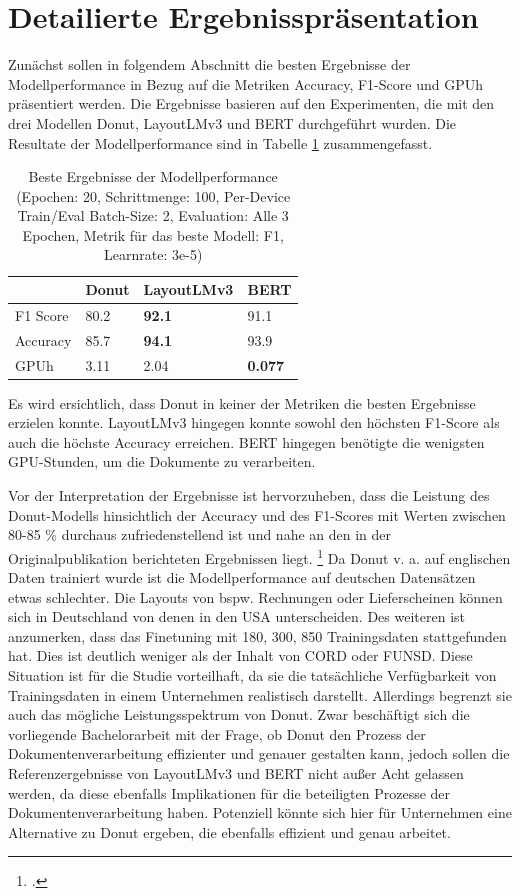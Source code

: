 \section{Detailierte Ergebnisspräsentation}
Zunächst sollen in folgendem Abschnitt die besten Ergebnisse der Modellperformance in Bezug auf die Metriken Accuracy, F1-Score und GPUh präsentiert werden. Die Ergebnisse basieren auf den Experimenten, die mit den drei Modellen Donut, LayoutLMv3 und BERT durchgeführt wurden. Die Resultate der Modellperformance sind in Tabelle \ref{tab:best_results} zusammengefasst.
\begin{table}[h]    
\centering
    \begin{tabularx}{\textwidth}{lXXX}
      \toprule
      & \textbf{Donut} & \textbf{LayoutLMv3} & \textbf{BERT}  \\
      \midrule
      F1 Score & 80.2 & \textbf{92.1} & 91.1 \\
      \addlinespace
      Accuracy & 85.7 & \textbf{94.1} & 93.9 \\
        \addlinespace
        GPUh & 3.11 & 2.04 & \textbf{0.077} \\
      \bottomrule
    \end{tabularx}
    \caption{Beste Ergebnisse der Modellperformance (Epochen: 20, Schrittmenge: 100, Per-Device Train/Eval Batch-Size: 2, Evaluation: Alle 3 Epochen, Metrik für das beste Modell: F1, Learnrate: 3e-5)}
    \label{tab:best_results}
\end{table}
Es wird ersichtlich, dass Donut in keiner der Metriken die besten Ergebnisse erzielen konnte. LayoutLMv3 hingegen konnte sowohl den höchsten F1-Score als auch die höchste Accuracy erreichen. BERT hingegen benötigte die wenigsten GPU-Stunden, um die Dokumente zu verarbeiten. 

Vor der Interpretation der Ergebnisse ist hervorzuheben, dass die Leistung des Donut-Modells hinsichtlich der Accuracy und des F1-Scores mit Werten zwischen 80-85 \% durchaus zufriedenstellend ist und nahe an den in der Originalpublikation berichteten Ergebnissen liegt. \footcites[Vgl.][]{kim_ocr-free_2021} Da Donut v. a. auf englischen Daten trainiert wurde ist die Modellperformance auf deutschen Datensätzen etwas schlechter. Die Layouts von bspw. Rechnungen oder Lieferscheinen können sich in Deutschland von denen in den USA unterscheiden. Des weiteren ist anzumerken, dass das Finetuning mit 180, 300, 850 Trainingsdaten stattgefunden hat. Dies ist deutlich weniger als der Inhalt von \ac{CORD} oder \ac{FUNSD}. Diese Situation ist für die Studie vorteilhaft, da sie die tatsächliche Verfügbarkeit von Trainingsdaten in einem Unternehmen realistisch darstellt. Allerdings begrenzt sie auch das mögliche Leistungsspektrum von Donut. Zwar beschäftigt sich die vorliegende Bachelorarbeit mit der Frage, ob Donut den Prozess der Dokumentenverarbeitung effizienter und genauer gestalten kann, jedoch sollen die Referenzergebnisse von LayoutLMv3 und BERT nicht außer Acht gelassen werden, da diese ebenfalls Implikationen für die beteiligten Prozesse der Dokumentenverarbeitung haben. Potenziell könnte sich hier für Unternehmen eine Alternative zu Donut ergeben, die ebenfalls effizient und genau arbeitet.

